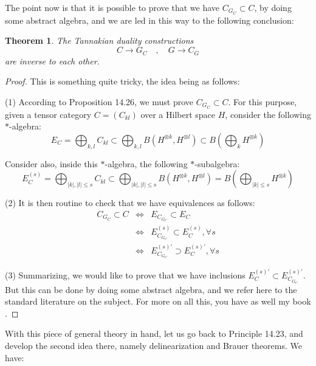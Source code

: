 \documentclass[12pt]{amsbook}
\newtheorem{theorem}{Theorem}[chapter]
\begin{document}
The point now is that it is possible to prove that we have $C_{G_C}\subset C$, by doing some abstract algebra, and we are led in this way to the following conclusion:

\begin{theorem}
The Tannakian duality constructions 
$$C\to G_C\quad,\quad 
G\to C_G$$
are inverse to each other.
\end{theorem}

\begin{proof}
This is something quite tricky, the idea being as follows:

\medskip

(1) According to Proposition 14.26, we must prove $C_{G_C}\subset C$. For this purpose, given a tensor category $C=(C_{kl})$ over a Hilbert space $H$, consider the following $*$-algebra:
$$E_C
=\bigoplus_{k,l}C_{kl}
\subset\bigoplus_{k,l}B(H^{\otimes k},H^{\otimes l})
\subset B\left(\bigoplus_kH^{\otimes k}\right)$$

Consider also, inside this $*$-algebra, the following $*$-subalgebra:
$$E_C^{(s)}
=\bigoplus_{|k|,|l|\leq s}C_{kl}
\subset\bigoplus_{|k|,|l|\leq s}B(H^{\otimes k},H^{\otimes l})
=B\left(\bigoplus_{|k|\leq s}H^{\otimes k}\right)$$

(2) It is then routine to check that we have equivalences as follows:
\begin{eqnarray*}
C_{G_C}\subset C
&\iff&E_{C_{G_C}}\subset E_C\\
&\iff&E_{C_{G_C}}^{(s)}\subset E_C^{(s)},\forall s\\
&\iff&E_{C_{G_C}}^{(s)'}\supset E_C^{(s)'},\forall s
\end{eqnarray*}

(3) Summarizing, we would like to prove that we have inclusions $E_C^{(s)'}\subset E_{C_{G_C}}^{(s)'}$. But this can be done by doing some abstract algebra, and we refer here to the standard literature on the subject. For more on all this, you have as well my book \cite{ba1}.
\end{proof}

With this piece of general theory in hand, let us go back to Principle 14.23, and develop the second idea there, namely delinearization and Brauer theorems. We have:
\end{document}
